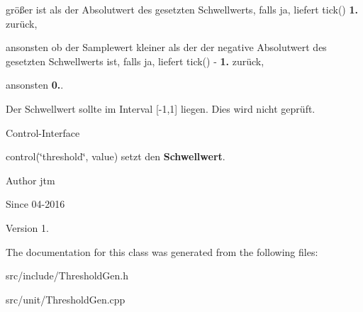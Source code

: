 \begin{DoxyItemize}
\item größer ist als der Absolutwert des gesetzten Schwellwerts, falls ja, liefert tick() {\bfseries 1.} zurück,
\item ansonsten ob der Samplewert kleiner als der der negative Absolutwert des gesetzten Schwellwerts ist, falls ja, liefert tick() -\/ {\bfseries 1.} zurück,
\item ansonsten {\bfseries 0.}.
\end{DoxyItemize}

Der Schwellwert sollte im Interval \mbox{[}-\/1,1\mbox{]} liegen. Dies wird nicht geprüft.

Control-\/\-Interface


\begin{DoxyItemize}
\item control(\char`\"{}threshold\char`\"{}, value) setzt den {\bfseries Schwellwert}.
\end{DoxyItemize}

\begin{DoxyAuthor}{Author}
jtm 
\end{DoxyAuthor}
\begin{DoxySince}{Since}
04-\/2016 
\end{DoxySince}
\begin{DoxyVersion}{Version}
1. 
\end{DoxyVersion}


The documentation for this class was generated from the following files\-:\begin{DoxyCompactItemize}
\item 
src/include/Threshold\-Gen.\-h\item 
src/unit/Threshold\-Gen.\-cpp\end{DoxyCompactItemize}
